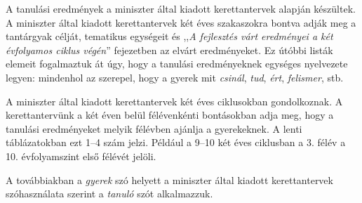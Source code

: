 \documentclass[10pt,openright,twoside]{book}
\begin{document}
A tanulási eredmények a miniszter által kiadott kerettantervek \cite{ofi:kerettanterv} alapján készültek. A miniszter által kiadott kerettantervek két éves szakaszokra bontva adják meg a tantárgyak célját, tematikus egységeit és ,,\emph{A fejlesztés várt eredményei a két évfolyamos ciklus végén}'' fejezetben az elvárt eredményeket. Ez útóbbi listák elemeit fogalmaztuk át úgy, hogy a tanulási eredményeknek egységes nyelvezete legyen: mindenhol az szerepel, hogy a gyerek mit \emph{csinál}, \emph{tud}, \emph{ért}, \emph{felismer}, stb.

A miniszter által kiadott kerettantervek két éves ciklusokban gondolkoznak. A kerettantervünk a két éven belül félévenkénti bontásokban adja meg, hogy a tanulási eredményeket melyik félévben ajánlja a gyerekeknek. A lenti táblázatokban ezt 1--4 szám jelzi. Például a 9--10 két éves ciklusban a 3. félév a 10. évfolyamszint első félévét jelöli.

A továbbiakban a \emph{gyerek} szó helyett a miniszter által kiadott kerettantervek szóhasználata szerint a \emph{tanuló} szót alkalmazzuk.



{}
\label{sec:bibliographyk}

\end{document}

